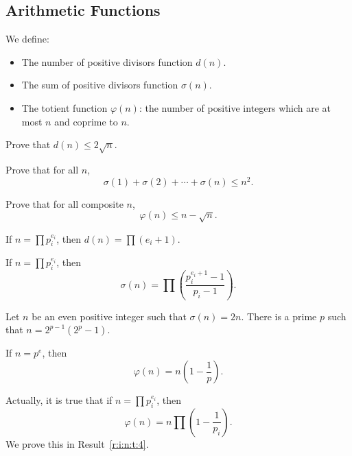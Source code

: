 \subsection{Arithmetic Functions}
We define:
\begin{itemize}
    \item The number of positive divisors function $d(n)$.
    \item The sum of positive divisors function $\sigma(n)$.
    \item The totient function $\varphi(n)$: the number of positive integers
      which are at most $n$ and coprime to $n$.
\end{itemize}
\begin{problem}{\label{p:i:n:a:1}}
  Prove that $d(n)\le 2\sqrt n$.
\end{problem}
\begin{problem}{\label{p:i:n:a:2}}
  Prove that for all $n$,
    \[\sigma(1)+\sigma(2)+\cdots+\sigma(n)\le n^2.\]
\end{problem}
\begin{problem}{\label{p:i:n:a:3}}
  Prove that for all composite $n$,
    \[\varphi(n)\le n-\sqrt n.\]
\end{problem}
\begin{result}{\label{r:i:n:a:1}}
    If $n=\prod p_i^{e_i}$, then $d(n)=\prod(e_i+1)$.
\end{result}
\begin{result}{\label{r:i:n:a:2}}
    If $n=\prod p_i^{e_i}$, then
    \[\sigma(n)=\prod\left(\frac{p_i^{e_i+1}-1}{p_i-1}\right).\]
\end{result}
\begin{result}{\label{r:i:n:a:3}}
  Let $n$ be an even positive integer such that $\sigma(n)=2n$. There is a prime
  $p$ such that $n=2^{p-1}\left(2^p-1\right)$.
\end{result}
\begin{result}{\label{r:i:n:a:4}}
    If $n=p^e$, then
    \[\varphi(n)=n\left(1-\frac 1p\right).\]
\end{result}
Actually, it is true that if $n=\prod p_i^{e_i}$, then
\[\varphi(n)=n\prod\left(1-\frac 1{p_i}\right).\]
We prove this in Result~\ref{r:i:n:t:4}.
